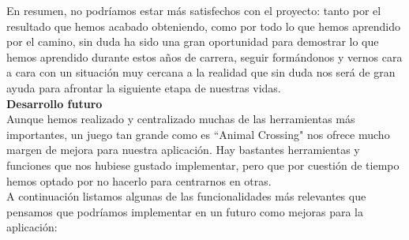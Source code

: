 En resumen, no podríamos estar más satisfechos con el proyecto: tanto por el resultado que hemos acabado obteniendo, como por todo lo que hemos aprendido por el camino, sin duda ha sido una gran oportunidad para demostrar lo que hemos aprendido durante estos años de carrera, seguir formándonos y vernos cara a cara con un situación muy cercana a la realidad que sin duda nos será de gran ayuda para afrontar la siguiente etapa de nuestras vidas.\\

\textbf{\large Desarrollo futuro}\\

Aunque hemos realizado y centralizado muchas de las herramientas más importantes, un juego tan grande como es ``Animal Crossing" nos ofrece mucho margen de mejora para nuestra aplicación. Hay bastantes herramientas y funciones que nos hubiese gustado implementar, pero que por cuestión de tiempo hemos optado por no hacerlo para centrarnos en otras.\\

A continuación listamos algunas de las funcionalidades más relevantes que pensamos que podríamos implementar en un futuro como mejoras para la aplicación:

